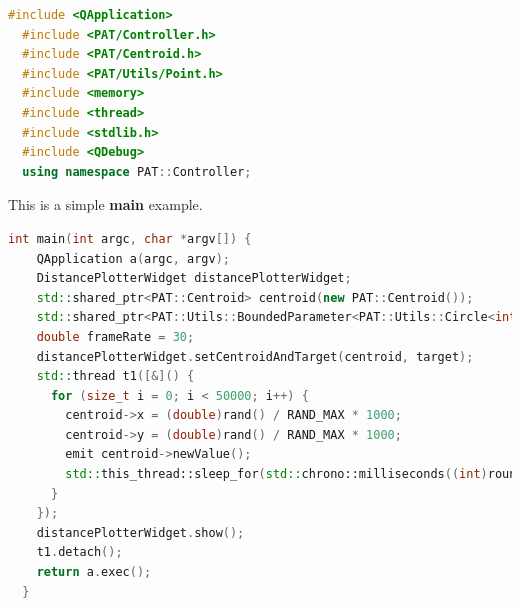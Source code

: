 \begin{lstlisting}[language=c++, gobble=2]
  #include <QApplication>
  #include <PAT/Controller.h>
  #include <PAT/Centroid.h>
  #include <PAT/Utils/Point.h>
  #include <memory>
  #include <thread>
  #include <stdlib.h>
  #include <QDebug>
  using namespace PAT::Controller;
\end{lstlisting}

This is a simple \textbf{main} example.

\begin{lstlisting}[language=c++, gobble=2]
  int main(int argc, char *argv[]) {
    QApplication a(argc, argv);
    DistancePlotterWidget distancePlotterWidget;
    std::shared_ptr<PAT::Centroid> centroid(new PAT::Centroid());
    std::shared_ptr<PAT::Utils::BoundedParameter<PAT::Utils::Circle<int>>> target(new PAT::Utils::BoundedParameter<PAT::Utils::Circle<int>>({0, 1000, 1, 500}, {0, 1000, 1, 500}));
    double frameRate = 30;
    distancePlotterWidget.setCentroidAndTarget(centroid, target);
    std::thread t1([&]() {
      for (size_t i = 0; i < 50000; i++) {
        centroid->x = (double)rand() / RAND_MAX * 1000;
        centroid->y = (double)rand() / RAND_MAX * 1000;
        emit centroid->newValue();
        std::this_thread::sleep_for(std::chrono::milliseconds((int)round(1000 / frameRate)));
      }
    });
    distancePlotterWidget.show();
    t1.detach();
    return a.exec();
  }
\end{lstlisting}


